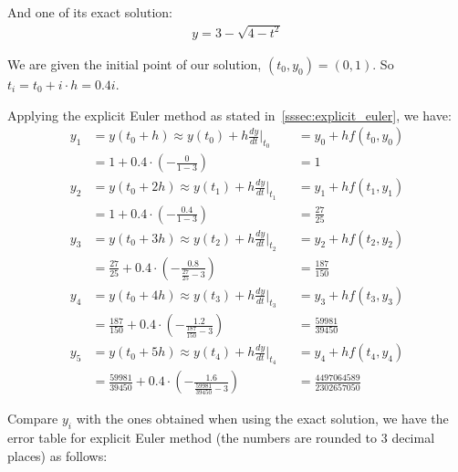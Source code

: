 \documentclass[a4paper]{article}
\numberwithin{equation}{section}
\begin{document}
And one of its exact solution:
\begin{align*}
  y = 3 - \sqrt{4-t^2}
\end{align*}

We are given the initial point of our solution, \((t_0, y_0) = (0, 1)\). So \(t_i = t_0 + i \cdot h = 0.4i\).

Applying the explicit Euler method as stated in~\ref{sssec:explicit_euler}, we have:
\begin{align*}
  y_1 & = y(t_0 + h) \approx y(t_0) + h\frac{dy}{dt}\biggr|_{t_0}                           &  & = y_0 + hf(t_0, y_0)            \\
      & = 1 + 0.4 \cdot \left(-\frac{0}{1-3}\right)                                         &  & = 1                             \\
  y_2 & = y(t_0 + 2h) \approx y(t_1) + h\frac{dy}{dt}\biggr|_{t_1}                          &  & = y_1 + hf(t_1, y_1)            \\
      & = 1 + 0.4 \cdot \left(-\frac{0.4}{1-3}\right)                                       &  & = \frac{27}{25}                 \\
  y_3 & = y(t_0 + 3h) \approx y(t_2) + h\frac{dy}{dt}\biggr|_{t_2}                          &  & = y_2 + hf(t_2, y_2)            \\
      & = \frac{27}{25} + 0.4 \cdot \left(-\frac{0.8}{\frac{27}{25} - 3}\right)             &  & = \frac{187}{150}               \\
  y_4 & = y(t_0 + 4h) \approx y(t_3) + h\frac{dy}{dt}\biggr|_{t_3}                          &  & = y_3 + hf(t_3, y_3)            \\
      & = \frac{187}{150} + 0.4 \cdot \left(-\frac{1.2}{\frac{187}{150} - 3}\right)         &  & = \frac{59981}{39450}           \\
  y_5 & = y(t_0 + 5h) \approx y(t_4) + h\frac{dy}{dt}\biggr|_{t_4}                          &  & = y_4 + hf(t_4, y_4)            \\
      & = \frac{59981}{39450} + 0.4 \cdot \left(-\frac{1.6}{\frac{59981}{39450} - 3}\right) &  & = \frac{4497064589}{2302657050}
\end{align*}

Compare \(y_i\) with the ones obtained when using the exact solution, we have the error table for explicit Euler method (the numbers are rounded to 3 decimal places) as follows:
\end{document}
